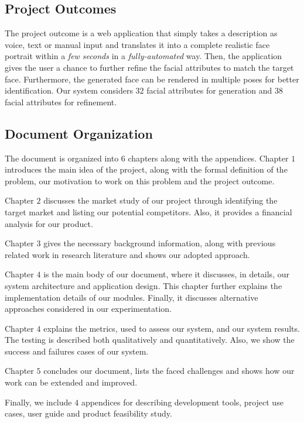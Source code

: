 \subsection{Project Outcomes}
The project outcome is a web application that simply takes a description as voice, text or manual input and translates it into a complete realistic face portrait within a \emph{few seconds} in a \emph{fully-automated} way. Then, the application gives the user a chance to further refine the facial attributes to match the target face. Furthermore, the generated face can be rendered in multiple poses for better identification. Our system considers $32$ facial attributes for generation and $38$ facial attributes for refinement.

\subsection{Document Organization}
The document is organized into $6$ chapters along with the appendices. Chapter $1$ introduces the main idea of the project, along with the formal definition of the problem, our motivation to work on this problem and the project outcome.

Chapter $2$ discusses the market study of our project through identifying the target market and listing our potential competitors. Also, it provides a financial analysis for our product.

Chapter $3$ gives the necessary background information, along with previous related work in research literature and shows our adopted approach.

Chapter $4$ is the main body of our document, where it discusses, in details, our system architecture and application design. This chapter further explains the implementation details of our modules. Finally, it discusses alternative approaches considered in our experimentation.

Chapter $4$ explains the metrics, used to assess our system, and our system results. The testing is described both qualitatively and quantitatively. Also, we show the success and failures cases of our system.

Chapter $5$ concludes our document, lists the faced challenges and shows how our work can be extended and improved.

Finally, we include $4$ appendices for describing development tools, project use cases, user guide and product feasibility study.
